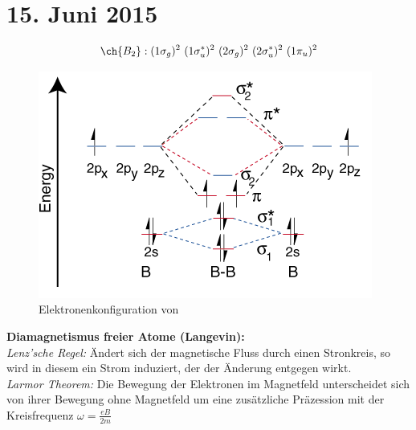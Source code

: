 \section{15. Juni 2015}

\label{q:31}

\[\ch{B_2} : (1\sigma_g)^2 ~ (1\sigma_u^*)^2 ~ (2\sigma_g)^2 ~ (2\sigma_u^*)^2 ~ (1\pi_u)^2\]

\begin{figure}[H]
    \centering
    \begin{samepage}
        \includegraphics[width=0.8\linewidth]{resources/15-06-2015/b2.PNG}
        \caption{Elektronenkonfiguration von }
    \end{samepage}
\end{figure}

\label{q:32}

\textbf{Diamagnetismus freier Atome (Langevin):} \\
\textit{Lenz'sche Regel:} Ändert sich der magnetische Fluss durch einen Stronkreis, so wird in diesem ein Strom induziert, der der Änderung entgegen wirkt. \\
\textit{Larmor Theorem:} Die Bewegung der Elektronen im Magnetfeld unterscheidet sich von ihrer Bewegung ohne Magnetfeld um eine zusätzliche Präzession mit der Kreisfrequenz $\omega = \frac{e B}{2 m}$ \\

